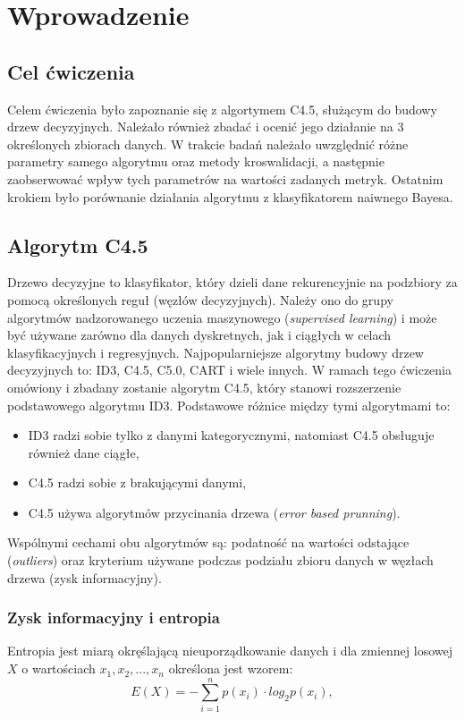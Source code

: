 \section{Wprowadzenie}
    \subsection{Cel ćwiczenia}
    Celem ćwiczenia było zapoznanie się z algortymem C4.5, służącym do budowy drzew decyzyjnych. Należało również 
    zbadać i ocenić jego działanie na 3 określonych zbiorach danych. W trakcie badań należało uwzględnić różne parametry
    samego algorytmu oraz metody kroswalidacji, a następnie zaobserwować wpływ tych parametrów na wartości zadanych metryk.
    Ostatnim krokiem było porównanie działania algorytmu z klasyfikatorem naiwnego Bayesa.

    \subsection{Algorytm C4.5}
    Drzewo decyzyjne to klasyfikator, który dzieli dane rekurencyjnie na podzbiory za pomocą określonych
    reguł (węzłów decyzyjnych). Należy ono do grupy algorytmów nadzorowanego uczenia maszynowego (\textit{supervised 
    learning}) i może być używane zarówno dla danych dyskretnych, jak i ciągłych w celach klasyfikacyjnych i regresyjnych. 
    Najpopularniejsze algorytmy budowy drzew decyzyjnych to: ID3, C4.5, C5.0, CART i wiele innych. W ramach tego ćwiczenia 
    omówiony i zbadany zostanie algorytm C4.5, który stanowi rozszerzenie podstawowego algorytmu ID3. Podstawowe różnice 
    między tymi algorytmami to:
    \begin{itemize}
      \item{ID3 radzi sobie tylko z danymi kategorycznymi, natomiast C4.5 obsługuje również dane ciągłe,}
      \item{C4.5 radzi sobie z brakującymi danymi,}
      \item{C4.5 używa algorytmów przycinania drzewa (\textit{error based prunning}).}
    \end{itemize} 
    Wspólnymi cechami obu algorytmów są: podatność na wartości odstające (\textit{outliers}) oraz kryterium używane
    podczas podziału zbioru danych w węzłach drzewa (zysk informacyjny). 

    \subsubsection*{Zysk informacyjny i entropia}
    Entropia jest miarą okręślającą nieuporządkowanie danych i dla zmiennej losowej $X$ o wartościach ${x_1, x_2, ..., x_n}$
    określona jest wzorem:
    $$ E(X) = - \sum_{i = 1}^{n} p(x_i) \cdot log_2 p(x_i),$$

